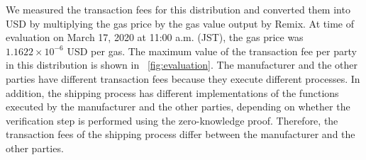 \documentclass[conference]{IEEEtran}
\begin{document}
We measured the transaction fees for this distribution
and converted them into USD by multiplying the gas price by the gas value output by Remix.
At time of evaluation on March 17, 2020 at 11:00 a.m. (JST), the gas price was $1.1622 \times 10^{-6}$ USD per gas.
The maximum value of the transaction fee per party in this distribution is shown in \figurename~\ref{fig:evaluation}.
The manufacturer and the other %
parties have different %
transaction fees because they execute different processes.
In addition, the shipping process has different implementations of the functions executed by the manufacturer and the other %
parties, depending on whether the verification step is performed using the zero-knowledge proof.
Therefore, the transaction fees of the shipping process differ between the manufacturer and the other %
parties.
\end{document}
